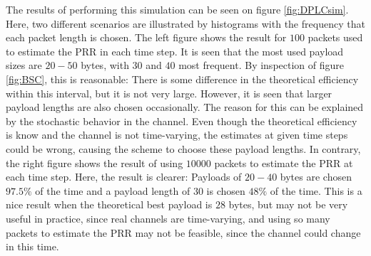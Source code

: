 The results of performing this simulation can be seen on figure \ref{fig:DPLCsim}. Here, two different scenarios are illustrated by histograms with the frequency that each packet length is chosen. The left figure shows the result for $100$ packets used to estimate the PRR in each time step. It is seen that the most used payload sizes are $20-50$ bytes, with $30$ and $40$ most frequent. By inspection of figure \ref{fig:BSC}, this is reasonable: There is some difference in the theoretical efficiency within this interval, but it is not very large. However, it is seen that larger payload lengths are also chosen occasionally. The reason for this can be explained by the stochastic behavior in the channel. Even though the theoretical efficiency is know and the channel is not time-varying, the estimates at given time steps could be wrong, causing the scheme to choose these payload lengths. In contrary, the right figure shows the result of using $10000$ packets to estimate the PRR at each time step. Here, the result is clearer: Payloads of $20-40$ bytes are chosen $97.5\%$ of the time and a payload length of $30$ is chosen $48\%$ of the time. This is a nice result when the theoretical best payload is $28$ bytes, but may not be very useful in practice, since real channels are time-varying, and using so many packets to estimate the PRR may not be feasible, since the channel could change in this time.

